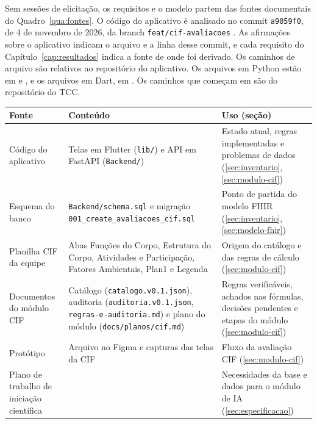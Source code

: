 Sem sessões de elicitação, os requisitos e o modelo partem das fontes documentais do Quadro~\ref{qua:fontes}. O
código do aplicativo é analisado no commit \texttt{a9059f0}, de 4 de novembro de 2026, da branch
\texttt{feat/cif-avaliacoes} \cite{higa2026bemtevi}. As afirmações sobre o aplicativo indicam o arquivo e a linha
desse commit, e cada requisito do Capítulo~\ref{cap:resultados} indica a fonte de onde foi derivado. Os caminhos de
arquivo são relativos ao repositório do aplicativo. Os arquivos em Python estão em  e
, e os arquivos em Dart, em . Os caminhos que começam em  são do
repositório do TCC.

\begin{quadro}[htb]
	\centering
	\caption{Fontes documentais do trabalho}
	\label{qua:fontes}
	\footnotesize
	\begin{tabularx}{\textwidth}{|>{\raggedright\arraybackslash}p{}|>{\raggedright\arraybackslash}X|>{\raggedright\arraybackslash}p{}|}
		\hline
		Fonte & Conteúdo & Uso (seção) \\ \hline
		Código do aplicativo & Telas em Flutter (\texttt{lib/}) e API em FastAPI (\texttt{Backend/})
			\cite{higa2026bemtevi} & Estado atual, regras implementadas e problemas de dados
			(\ref{sec:inventario}, \ref{sec:modulo-cif}) \\ \hline
		Esquema do banco & \texttt{Backend/schema.sql} e migração \texttt{001\_create\_avaliacoes\_cif.sql}
			& Ponto de partida do modelo FHIR (\ref{sec:inventario}, \ref{sec:modelo-fhir}) \\ \hline
		Planilha CIF da equipe & Abas Funções do Corpo, Estrutura do Corpo, Atividades e Participação, Fatores
			Ambientais, Plan1 e Legenda & Origem do catálogo e das regras de cálculo (\ref{sec:modulo-cif}) \\ \hline
		Documentos do módulo CIF & Catálogo (\texttt{catalogo.v0.1.json}), auditoria (\texttt{auditoria.v0.1.json},
			\texttt{regras-e-auditoria.md}) e plano do módulo (\texttt{docs/planos/cif.md}) & Regras verificáveis,
			achados nas fórmulas, decisões pendentes e etapas do módulo (\ref{sec:modulo-cif}) \\ \hline
		Protótipo & Arquivo no Figma e capturas das telas da CIF & Fluxo da avaliação CIF (\ref{sec:modulo-cif}) \\ \hline
		Plano de trabalho de iniciação científica & \citeonline{ochoadiaz2026plano} & Necessidades da base e dados
			para o módulo de IA (\ref{sec:especificacao}) \\ \hline

\end{tabularx}
\end{quadro}

